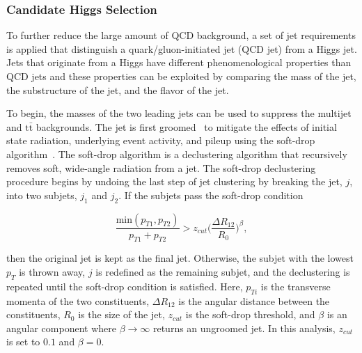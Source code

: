 \subsubsection{Candidate Higgs Selection}

To further reduce the large amount of QCD background, a set of jet requirements is applied that distinguish a quark/gluon-initiated jet (QCD jet) from a Higgs jet. Jets that originate from a Higgs have different phenomenological properties than QCD jets and these properties can be exploited by comparing the mass of the jet, the substructure of the jet, and the flavor of the jet. 

To begin, the masses of the two leading jets can be used to suppress the multijet and $\mathrm{t\bar{t}}$ backgrounds. The jet is first groomed~\cite{JetGrooming} to mitigate the effects of initial state radiation, underlying event activity, and pileup using the soft-drop algorithm~\cite{SDMass, SoftDrop}. The soft-drop algorithm is a declustering algorithm that recursively removes soft, wide-angle radiation from a jet. The soft-drop declustering procedure begins by undoing the last step of jet clustering by breaking the jet, $j$, into two subjets, $j_{1}$ and $j_{2}$. If the subjets pass the soft-drop condition

\begin{equation}
\frac{\mathrm{min}(p_{T1},p_{T2})}{p_{T1}+p_{T2}} > z_{cut}\bigg(\frac{\Delta R_{12}}{R_{0}}\bigg)^{\beta},
\end{equation}

\noindent
then the original jet is kept as the final jet. Otherwise, the subjet with the lowest $p_{T}$ is thrown away, $j$ is redefined as the remaining subjet, and the declustering is repeated until the soft-drop condition is satisfied. Here, $p_{Ti}$ is the transverse momenta of the two constituents, $\Delta R_{12}$ is the angular distance between the constituents, $R_{0}$ is the size of the jet, $z_{cut}$ is the soft-drop threshold, and $\beta$ is an angular component where $\beta\rightarrow\infty$ returns an ungroomed jet. In this analysis, $z_{cut}$ is set to $0.1$ and $\beta = 0$. 

